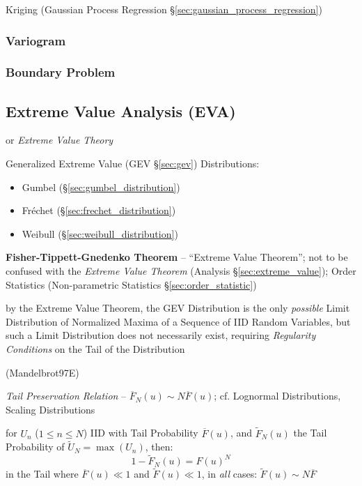 Kriging (Gaussian Process Regression \S\ref{sec:gaussian_process_regression})



\subsubsection{Variogram}\label{sec:variogram}

\subsubsection{Boundary Problem}\label{sec:boundary_problem}



\subsection{Extreme Value Analysis (EVA)}\label{sec:eva}

or \emph{Extreme Value Theory}

Generalized Extreme Value (GEV \S\ref{sec:gev}) Distributions:

\begin{itemize}
  \item Gumbel (\S\ref{sec:gumbel_distribution})
  \item Fr\'echet (\S\ref{sec:frechet_distribution})
  \item Weibull (\S\ref{sec:weibull_distribution})
\end{itemize}

\textbf{Fisher-Tippett-Gnedenko Theorem} -- ``Extreme Value Theorem''; not to be
confused with the \emph{Extreme Value Theorem} (Analysis
\S\ref{sec:extreme_value}); Order Statistics (Non-parametric Statistics
\S\ref{sec:order_statistic})

by the Extreme Value Theorem, the GEV Distribution is the only \emph{possible}
Limit Distribution of Normalized Maxima of a Sequence of IID Random Variables,
but such a Limit Distribution does not necessarily exist, requiring
\emph{Regularity Conditions} on the Tail of the Distribution

(Mandelbrot97E)

\emph{Tail Preservation Relation} -- $\overline{F}_N(u) \sim N \overline{F}(u)$;
cf. Lognormal Distributions, Scaling Distributions

for $U_n$ ($1 \leq n \leq N$) IID with Tail Probability $\overline{F}(u)$, and
$\tilde{F}_N(u)$ the Tail Probability of $\tilde{U}_N = \max(U_n)$, then:
\[
  1 - \tilde{F}_N(u) = F(u)^N
\]
in the Tail where $\overline{F}(u) \ll 1$ and $\tilde{F}(u) \ll 1$, in
\emph{all} cases: $\tilde{F}(u) \sim N \overline{F}$



